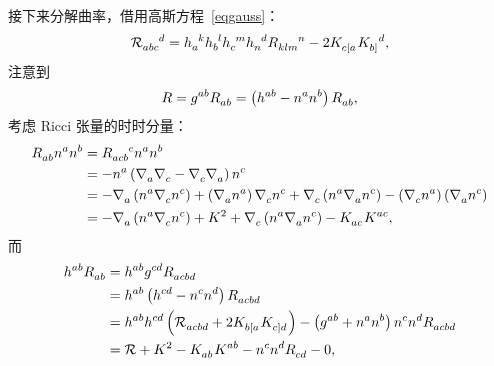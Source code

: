 \begin{Proof}
			接下来分解曲率，借用高斯方程~\eqref{eqgauss}：
			\begin{equation*}
				\tensor{\spacecurR}{_a_b_c^d} = \tensor{h}{_a^k} \tensor{h}{_b^l} \tensor{h}{_c^m} \tensor{h}{_n^d} \tensor{\curR}{_k_l_m^n} - 2 \tensor{K}{_{c[a}} \tensor{K}{_{b]}^d},
			\end{equation*}
			注意到
			\begin{equation*}
				R = \tensor{g}{^a^b} \tensor{R}{_a_b} = \left( \tensor{h}{^a^b} - \tensor{n}{^a}\tensor{n}{^b} \right) \tensor{R}{_a_b},
			\end{equation*}
			考虑 Ricci 张量的时时分量：
			\begin{equation*}
				\begin{split}
					\tensor{R}{_a_b} \tensor{n}{^a} \tensor{n}{^b} &= \tensor{R}{_a_c_b^c} \tensor{n}{^a} \tensor{n}{^b}\\
					&= - \tensor{n}{^a} \left( \Nabla{a} \Nabla{c} - \Nabla{c} \Nabla{a} \right) \tensor{n}{^c}\\
					&= - \Nabla{a} \left( \tensor{n}{^a} \Nabla{c} \tensor{n}{^c} \right) + \left( \Nabla{a} \tensor{n}{^a} \right) \Nabla{c} \tensor{n}{^c} + \Nabla{c} \left( \tensor{n}{^a} \Nabla{a} \tensor{n}{^c} \right) - \left( \Nabla{c} \tensor{n}{^a} \right) \left( \Nabla{a} \tensor{n}{^c} \right)\\
					&= - \Nabla{a} \left( \tensor{n}{^a} \Nabla{c} \tensor{n}{^c} \right) + K^2 + \Nabla{c} \left( \tensor{n}{^a} \Nabla{a} \tensor{n}{^c} \right) - \tensor{K}{_a_c} \tensor{K}{^a^c},
				\end{split}
			\end{equation*}
			而
			\begin{equation*}
				\begin{split}
					\tensor{h}{^a^b} \tensor{R}{_a_b} &= \tensor{h}{^a^b} \tensor{g}{^c^d} \tensor{R}{_a_c_b_d}\\
					&= \tensor{h}{^a^b} \left( \tensor{h}{^c^d} - \tensor{n}{^c} \tensor{n}{^d} \right) \tensor{R}{_a_c_b_d}\\
					&= \tensor{h}{^a^b} \tensor{h}{^c^d} \left( \tensor{\spacecurR}{_a_c_b_d} + 2 \tensor{K}{_{b[a}} \tensor{K}{_{c]d}} \right) - \left( \tensor{g}{^a^b} + \tensor{n}{^a} \tensor{n}{^b} \right) \tensor{n}{^c} \tensor{n}{^d} \tensor{R}{_a_c_b_d}\\
					&= \spacecurR + K^2 - \tensor{K}{_a_b} \tensor{K}{^a^b} - \tensor{n}{^c} \tensor{n}{^d} \tensor{R}{_c_d} - 0,
				\end{split}
			\end{equation*}

\end{Proof}

